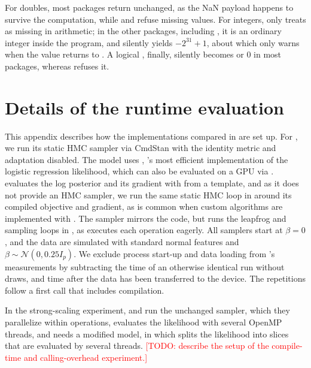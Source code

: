 \documentclass[article,shortnames]{jss}
\begin{document}
\begin{appendix}
For doubles, most packages return  unchanged, as the NaN payload happens to survive the computation, while  and  refuse missing values.
For integers, only  treats  as missing in arithmetic; in the other packages, including , it is an ordinary integer inside the program, and  silently yields $-2^{31} + 1$, about which  only warns when the value returns to .
A logical , finally, silently becomes  or 0 in most packages, whereas  refuses it.

\section{Details of the runtime evaluation}\label{appendix-runtime}

This appendix describes how the implementations compared in  are set up.
For , we run its static HMC sampler via CmdStan with the identity metric and adaptation disabled.
The  model uses , 's most efficient implementation of the logistic regression likelihood, which can also be evaluated on a GPU via .
 evaluates the log posterior and its gradient with  from a  template, and as it does not provide an HMC sampler, we run the same static HMC loop in  around its compiled objective and gradient, as is common when custom algorithms are implemented with .
The  sampler mirrors the  code, but runs the leapfrog and sampling loops in , as  executes each operation eagerly.
All samplers start at $\beta = 0$, and the data are simulated with standard normal features and $\beta \sim \mathcal{N}(0, 0.25 I_p)$.
We exclude process start-up and data loading from 's measurements by subtracting the time of an otherwise identical run without draws, and time  after the data has been transferred to the device.
The repetitions follow a first call that includes compilation.

In the strong-scaling experiment,  and  run the unchanged sampler, which they parallelize within operations,  evaluates the likelihood with several OpenMP threads, and  needs a modified model, in which  splits the likelihood into slices that are evaluated by several threads.
\textcolor{red}{[TODO: describe the setup of the compile-time and calling-overhead experiment.]}


\end{appendix}
\end{document}
